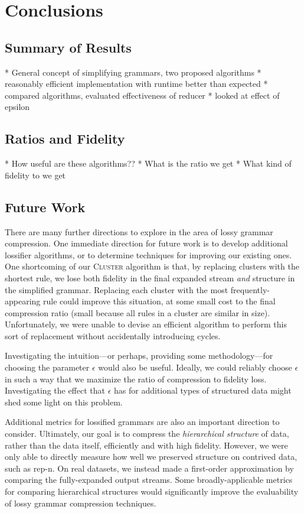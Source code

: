 \documentclass[11pt]{article}
\newcommand{\Cluster}{\textsc{Cluster}\xspace}
\begin{document}
\section{Conclusions}

\subsection{Summary of Results}

* General concept of simplifying grammars, two proposed algorithms
* reasonably efficient implementation with runtime better than expected
* compared algorithms, evaluated effectiveness of reducer
* looked at effect of epsilon

\subsection{Ratios and Fidelity}

* How useful are these algorithms??
* What is the ratio we get
* What kind of fidelity to we get

\subsection{Future Work}

There are many further directions to explore in the area of lossy grammar
compression.  One immediate direction for future work is to develop additional
lossifier algorithms, or to determine techniques for improving our existing
ones.  One shortcoming of our \Cluster algorithm is that, by replacing clusters
with the shortest rule, we lose both fidelity in the final expanded stream
\emph{and} structure in the simplified grammar.  Replacing each cluster with
the most frequently-appearing rule could improve this situation, at some small
cost to the final compression ratio (small because all rules in a cluster are
similar in size).  Unfortunately, we were unable to devise an efficient
algorithm to perform this sort of replacement without accidentally introducing
cycles.

Investigating the intuition---or perhaps, providing some methodology---for
choosing the parameter $\epsilon$ would also be useful.  Ideally, we could
reliably choose $\epsilon$ in such a way that we maximize the ratio of
compression to fidelity loss.  Investigating the effect that $\epsilon$ has for
additional types of structured data might shed some light on this problem.

Additional metrics for lossified grammars are also an important direction to
consider.  Ultimately, our goal is to compress the \emph{hierarchical
structure} of data, rather than the data itself, efficiently and with high
fidelity.  However, we were only able to directly measure how well we preserved
structure on contrived data, such as rep-n.  On real datasets, we instead made
a first-order approximation by comparing the fully-expanded output streams.
Some broadly-applicable metrics for comparing hierarchical structures would
significantly improve the evaluability of lossy grammar compression techniques.
\end{document}
